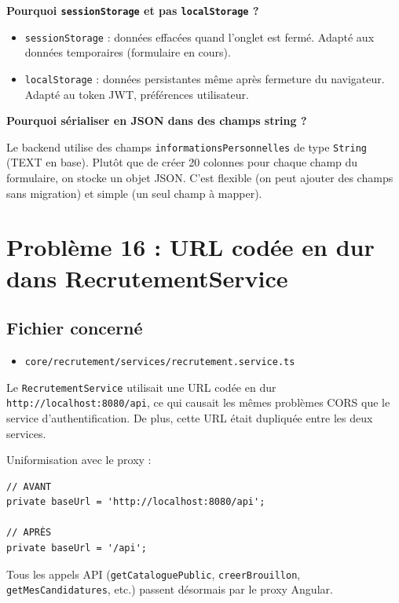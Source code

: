 \documentclass[a4paper,12pt,french]{article}
\begin{document}
\begin{lessonbox}
\textbf{Pourquoi \texttt{sessionStorage} et pas \texttt{localStorage} ?}

\begin{itemize}
    \item \texttt{sessionStorage} : données effacées quand l'onglet est fermé. Adapté aux données temporaires (formulaire en cours).
    \item \texttt{localStorage} : données persistantes même après fermeture du navigateur. Adapté au token JWT, préférences utilisateur.
\end{itemize}

\textbf{Pourquoi sérialiser en JSON dans des champs string ?}

Le backend utilise des champs \texttt{informationsPersonnelles} de type \texttt{String} (TEXT en base). Plutôt que de créer 20 colonnes pour chaque champ du formulaire, on stocke un objet JSON. C'est flexible (on peut ajouter des champs sans migration) et simple (un seul champ à mapper).
\end{lessonbox}

\newpage

\section{Problème 16 : URL codée en dur dans RecrutementService}

\subsection{Fichier concerné}
\begin{itemize}
    \item \texttt{core/recrutement/services/recrutement.service.ts}
\end{itemize}

\begin{problembox}
Le \texttt{RecrutementService} utilisait une URL codée en dur \texttt{http://localhost:8080/api}, ce qui causait les mêmes problèmes CORS que le service d'authentification. De plus, cette URL était dupliquée entre les deux services.
\end{problembox}

\begin{solutionbox}
Uniformisation avec le proxy :

\begin{lstlisting}[style=tsstyle]
// AVANT
private baseUrl = 'http://localhost:8080/api';

// APRÈS
private baseUrl = '/api';
\end{lstlisting}

Tous les appels API (\texttt{getCataloguePublic}, \texttt{creerBrouillon}, \texttt{getMesCandidatures}, etc.) passent désormais par le proxy Angular.
\end{solutionbox}
\end{document}
